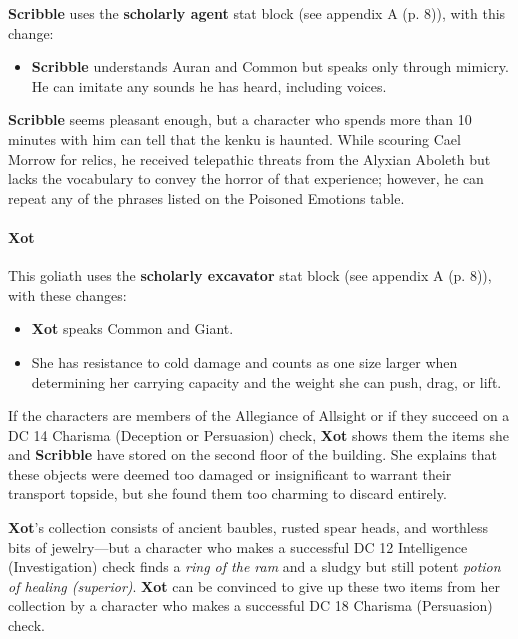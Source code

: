 \documentclass[a4paper, 11pt, bg=full, twocolumn, nooutline]{dndbook}
\begin{document}
\textbf{Scribble} uses the \textbf{scholarly agent} stat block (see appendix A (p. 8)), with this change:

\begin{itemize}
\item \textbf{Scribble} understands Auran and Common but speaks only through mimicry. He can imitate any sounds he has heard, including voices.
\end{itemize}

\textbf{Scribble} seems pleasant enough, but a character who spends more than 10 minutes with him can tell that the kenku is haunted. While scouring Cael Morrow for relics, he received telepathic threats from the Alyxian Aboleth but lacks the vocabulary to convey the horror of that experience; however, he can repeat any of the phrases listed on the Poisoned Emotions table.

\paragraph{Xot}

This goliath uses the \textbf{scholarly excavator} stat block (see appendix A (p. 8)), with these changes:

\begin{itemize}
\item \textbf{Xot} speaks Common and Giant.
\item She has resistance to cold damage and counts as one size larger when determining her carrying capacity and the weight she can push, drag, or lift.
\end{itemize}

If the characters are members of the Allegiance of Allsight or if they succeed on a DC 14 Charisma (Deception or Persuasion) check, \textbf{Xot} shows them the items she and \textbf{Scribble} have stored on the second floor of the building. She explains that these objects were deemed too damaged or insignificant to warrant their transport topside, but she found them too charming to discard entirely.

\textbf{Xot}'s collection consists of ancient baubles, rusted spear heads, and worthless bits of jewelry---but a character who makes a successful DC 12 Intelligence (Investigation) check finds a \textit{ring of the ram} and a sludgy but still potent \textit{potion of healing (superior)}. \textbf{Xot} can be convinced to give up these two items from her collection by a character who makes a successful DC 18 Charisma (Persuasion) check.
\end{document}
